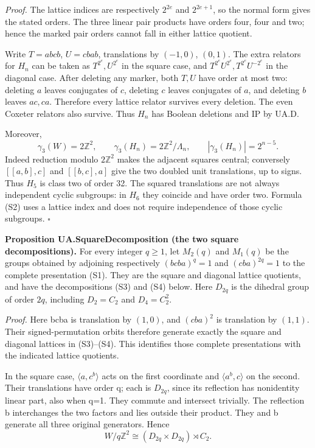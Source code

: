 \documentclass[
  11pt,
  a4paper,
]{article}
\begin{document}
\emph{Proof.} The lattice indices are respectively \(2^{2e}\) and
\(2^{2e+1}\), so the normal form gives the stated orders. The three
linear pair products have orders four, four and two; hence the marked
pair orders cannot fall in either lattice quotient.

Write \(T=abcb\), \(U=cbab\), translations by \((-1,0)\), \((0,1)\). The
extra relators for \(H_n\) can be taken as \(T^{2^e},U^{2^e}\) in the
square case, and \(T^{2^e}U^{2^e},T^{2^e}U^{-2^e}\) in the diagonal
case. After deleting any marker, both \(T,U\) have order at most two:
deleting \(a\) leaves conjugates of \(c\), deleting \(c\) leaves
conjugates of \(a\), and deleting \(b\) leaves \(ac,ca\). Therefore
every lattice relator survives every deletion. The even Coxeter relators
also survive. Thus \(H_n\) has Boolean deletions and IP by UA.D.

Moreover, \[
 \gamma_3(W)=2\mathbb Z^2,
 \qquad \gamma_3(H_n)=2\mathbb Z^2/\Lambda_n,
 \qquad |\gamma_3(H_n)|=2^{n-5}.                         \tag{S2}
\] Indeed reduction modulo \(2\mathbb Z^2\) makes the adjacent squares
central; conversely \([[a,b],c]\) and \([[b,c],a]\) give the two doubled
unit translations, up to signs. Thus \(H_5\) is class two of order 32.
The squared translations are not always independent cyclic subgroups: in
\(H_6\) they coincide and have order two. Formula (S2) uses a lattice
index and does not require independence of those cyclic subgroups.
\(\square\)

\textbf{Proposition UA.SquareDecomposition (the two square
decompositions).} For every integer \(q\ge1\), let \(M_2(q)\) and
\(M_1(q)\) be the groups obtained by adjoining respectively
\((bcba)^q=1\) and \((cba)^{2q}=1\) to the complete presentation (S1).
They are the square and diagonal lattice quotients, and have the
decompositions (S3) and (S4) below. Here \(D_{2q}\) is the dihedral
group of order \(2q\), including \(D_2=C_2\) and \(D_4=C_2^2\).

\emph{Proof.} Here bcba is translation by \((1,0)\), and \((cba)^2\) is
translation by \((1,1)\). Their signed-permutation orbits therefore
generate exactly the square and diagonal lattices in (S3)--(S4). This
identifies those complete presentations with the indicated lattice
quotients.

In the square case, \(\langle a,c^b\rangle\) acts on the first
coordinate and \(\langle a^b,c\rangle\) on the second. Their
translations have order q; each is \(D_{2q}\), since its reflection has
nonidentity linear part, also when q=1. They commute and intersect
trivially. The reflection b interchanges the two factors and lies
outside their product. They and b generate all three original
generators. Hence \[
 W/q\mathbb Z^2\cong(D_{2q}\times D_{2q})\rtimes C_2.
 \tag{S3}
\]
\end{document}
